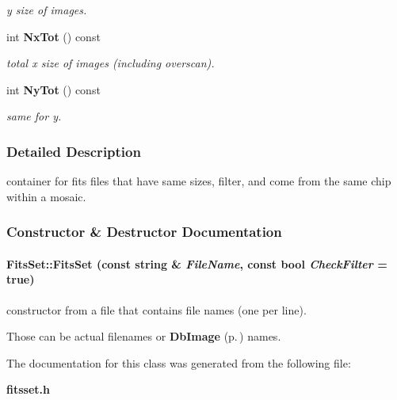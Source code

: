 \begin{CompactItemize}
\begin{CompactList}\small\item\em y size of images.\item\end{CompactList}\item 
{}
int {\bf Nx\-Tot} () const\label{class_fitsset_a6}

\begin{CompactList}\small\item\em total x size of images (including overscan).\item\end{CompactList}\item 
{}
int {\bf Ny\-Tot} () const\label{class_fitsset_a7}

\begin{CompactList}\small\item\em same for y.\item\end{CompactList}\end{CompactItemize}


\subsubsection{Detailed Description}
container for fits files that have same sizes, filter, and come from the same chip within a mosaic.



\subsubsection{Constructor \& Destructor Documentation}
\paragraph{\setlength{\rightskip}{0pt plus 5cm}Fits\-Set::Fits\-Set (const string \& {\em File\-Name}, const bool {\em Check\-Filter} = true)}\hfill\label{class_fitsset_a0}


constructor from a file that contains file names (one per line).

Those can be actual filenames or {\bf Db\-Image} {\rm (p.\,\pageref{class_dbimage})} names. 

The documentation for this class was generated from the following file:\begin{CompactItemize}
\item 
{\bf fitsset.h}\end{CompactItemize}
